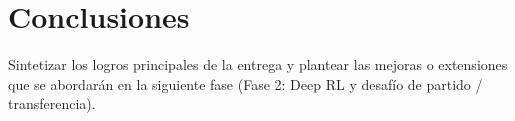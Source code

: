 \section{Conclusiones}
Sintetizar los logros principales de la entrega y plantear las mejoras o extensiones que se abordarán en la siguiente fase (Fase 2: Deep RL y desafío de partido / transferencia).